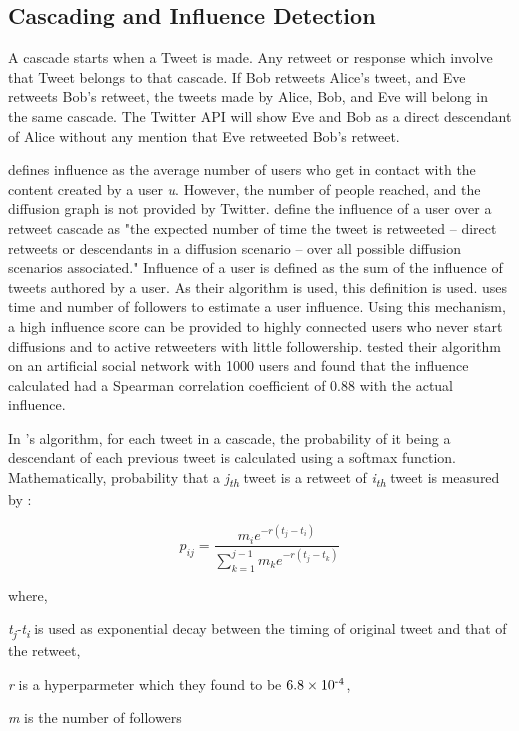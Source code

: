 \documentclass[letterpaper]{article}
\begin{document}
\subsection{Cascading and Influence Detection}
A cascade starts when a Tweet is made. Any retweet or response which involve that Tweet belongs to that cascade. If Bob retweets Alice's tweet, and Eve retweets Bob's retweet, the tweets
made by Alice, Bob, and Eve will belong in the same cascade. The Twitter API will show Eve and Bob as a direct descendant of Alice without any mention that Eve retweeted Bob's retweet. \par

\cite{du2013scalable} defines influence as the average number of users who get in contact with the content created by a user \textit{u}.
 However, the number of people reached, and the diffusion graph is not provided by Twitter. \cite{rizoiu2018debatenight} define the influence of a user over a retweet cascade as "the expected number of time the tweet is
 retweeted – direct retweets or descendants in a diffusion scenario – over all possible diffusion scenarios  associated." Influence of a user is defined as the sum of the influence of tweets
 authored by a user. As their algorithm is used, this definition is used. \cite{rizoiu2018debatenight} uses time and 
 number of followers to estimate a user influence. Using this mechanism, a high influence score can be provided to highly connected users who never start diffusions and 
 to active retweeters with little followership. \cite{rizoiu2018debatenight} tested their algorithm on an artificial social network with 1000 users and found that the influence calculated had a Spearman 
 correlation coefficient of 0.88 with the actual influence. \par 

In \cite{rizoiu2018debatenight}'s algorithm, for each tweet in a cascade, the probability of it being a descendant of each previous tweet is calculated using a softmax function. Mathematically, probability that a \textit{j\textsubscript{th}} 
tweet is a retweet of \textit{i\textsubscript{th}} tweet is measured by :\linebreak

\begin{equation*}
    p_{ij}=\frac{{m_{i}e^{-r(t_j-t_i)}}}{\sum_{k=1}^{j-1}m_ke^{-r(t_j-t_k)}}
    \label{eq:probablity}
\end{equation*}

where, \par
\textit{t\textsubscript{j}{-}t\textsubscript{i}} is used as exponential decay between the timing of original tweet and that of the retweet, \par
\textit{r} is a hyperparmeter which they found to be $6.8\times10\textsuperscript{-4}$, \par
\textit{m} is the number of followers \linebreak
\end{document}
